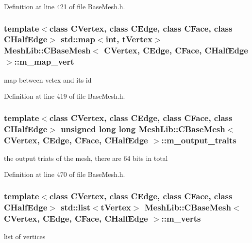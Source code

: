 Definition at line 421 of file Base\+Mesh.\+h.

\subsubsection[{\texorpdfstring{m\+\_\+map\+\_\+vert}{m_map_vert}}]{\setlength{\rightskip}{0pt plus 5cm}template$<$class C\+Vertex, class C\+Edge, class C\+Face, class C\+Half\+Edge$>$ std\+::map$<$int, {\bf t\+Vertex}$>$ {\bf Mesh\+Lib\+::\+C\+Base\+Mesh}$<$ {\bf C\+Vertex}, {\bf C\+Edge}, {\bf C\+Face}, {\bf C\+Half\+Edge} $>$\+::m\+\_\+map\+\_\+vert\hspace{0.3cm}{\ttfamily [protected]}}\hypertarget{class_mesh_lib_1_1_c_base_mesh_ad92d530f9eacd1eb2adef1770fd0ff80}{}\label{class_mesh_lib_1_1_c_base_mesh_ad92d530f9eacd1eb2adef1770fd0ff80}
map between vetex and its id 

Definition at line 419 of file Base\+Mesh.\+h.

\subsubsection[{\texorpdfstring{m\+\_\+output\+\_\+traits}{m_output_traits}}]{\setlength{\rightskip}{0pt plus 5cm}template$<$class C\+Vertex, class C\+Edge, class C\+Face, class C\+Half\+Edge$>$ unsigned long long {\bf Mesh\+Lib\+::\+C\+Base\+Mesh}$<$ {\bf C\+Vertex}, {\bf C\+Edge}, {\bf C\+Face}, {\bf C\+Half\+Edge} $>$\+::m\+\_\+output\+\_\+traits\hspace{0.3cm}{\ttfamily [static]}}\hypertarget{class_mesh_lib_1_1_c_base_mesh_af1a7720a0b51675ac91cc8c00d1959a3}{}\label{class_mesh_lib_1_1_c_base_mesh_af1a7720a0b51675ac91cc8c00d1959a3}
the output triats of the mesh, there are 64 bits in total 

Definition at line 470 of file Base\+Mesh.\+h.

\subsubsection[{\texorpdfstring{m\+\_\+verts}{m_verts}}]{\setlength{\rightskip}{0pt plus 5cm}template$<$class C\+Vertex, class C\+Edge, class C\+Face, class C\+Half\+Edge$>$ std\+::list$<${\bf t\+Vertex}$>$ {\bf Mesh\+Lib\+::\+C\+Base\+Mesh}$<$ {\bf C\+Vertex}, {\bf C\+Edge}, {\bf C\+Face}, {\bf C\+Half\+Edge} $>$\+::m\+\_\+verts\hspace{0.3cm}{\ttfamily [protected]}}\hypertarget{class_mesh_lib_1_1_c_base_mesh_a5738a63ce99209aa5085982ecc9ba50a}{}\label{class_mesh_lib_1_1_c_base_mesh_a5738a63ce99209aa5085982ecc9ba50a}
list of vertices 

